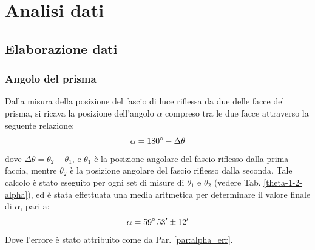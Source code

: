 \documentclass[]{article}
\let\oldsection\section%
\renewcommand{\section}{%
	\renewcommand{\theequation}{\thesection.\arabic{equation}}%
	\oldsection}%
\let\oldsubsection\subsection%
\renewcommand{\subsection}{%
	\renewcommand{\theequation}{\thesubsection.\arabic{equation}}%
	\oldsubsection}%
\begin{document}
    \section{Analisi dati}
    \subsection{Elaborazione dati}
    \subsubsection{Angolo del prisma}
    Dalla misura della posizione del fascio di luce riflessa da due delle facce del prisma, si ricava la posizione dell'angolo $\alpha$ compreso tra le due facce attraverso la seguente relazione:
    \begin{equation}
        \label{alpha}
        \alpha = 180\degree - \Delta\theta
    \end{equation}
    dove $\Delta\theta=\theta_2-\theta_1$, e $\theta_1$ è la posizione angolare del fascio riflesso dalla prima faccia, mentre $\theta_2$ è la posizione angolare del fascio riflesso dalla seconda.
    Tale calcolo è stato eseguito per ogni set di misure di $\theta_1$ e $\theta_2$ (vedere Tab. \ref{theta-1-2-alpha}), ed è stata effettuata una media aritmetica per determinare il valore finale di $\alpha$, pari a: 
    \begin{equation}
        \label{alpha-value}
        \alpha = 59 \degree \, 53' \pm 12'
    \end{equation}
    Dove l'errore è stato attribuito come da Par. \ref{par:alpha_err}.
\end{document}
